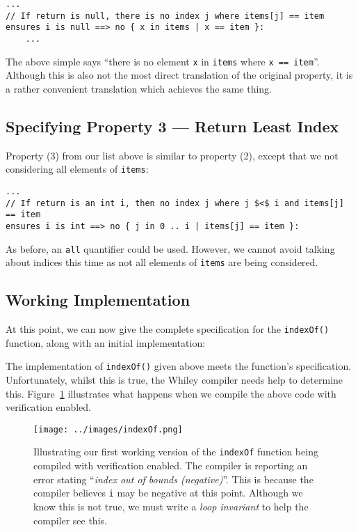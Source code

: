 \begin{lstlisting}
...
// If return is null, there is no index j where items[j] == item
ensures i is null ==> no { x in items | x == item }:
    ...
\end{lstlisting}

The above simple says ``there is no element \lstinline{x} in
\lstinline{items} where \lstinline{x == item}''.  Although this is
also not the most direct translation of the original property, it is a
rather convenient translation which achieves the same thing.

\subsection{Specifying Property 3 --- Return Least Index}

Property (3) from our list above is similar to property (2), except
that we not considering all elements of \lstinline{items}:

\begin{lstlisting}
...
// If return is an int i, then no index j where j $<$ i and items[j] == item
ensures i is int ==> no { j in 0 .. i | items[j] == item }:
\end{lstlisting}

As before, an \lstinline{all} quantifier could be used.  However,
we cannot avoid talking about indices this time as not all elements of
\lstinline{items} are being considered.

\subsection{Working Implementation}

At this point, we can now give the complete specification for the
\lstinline{indexOf()} function, along with an initial implementation:



The implementation of \lstinline{indexOf()} given above meets the
function's specification.  Unfortunately, whilst this is true, the
Whiley compiler needs help to determine this.  Figure~\ref{eg_indexOf}
illustrates what happens when we compile the above code with
verification enabled.

\begin{figure}[!t]
\centering
\texttt{[image: ../images/indexOf.png]}
\caption{Illustrating our first working version of the
  \lstinline{indexOf} function being compiled with verification
  enabled.  The compiler is reporting an error stating ``{\em index out of
  bounds (negative)}''.  This is because the compiler believes
  \lstinline{i} may be negative at this point.  Although we know this
  is not true, we must write a {\em loop invariant} to help the
  compiler see this.}
\label{eg_indexOf}
\end{figure}


